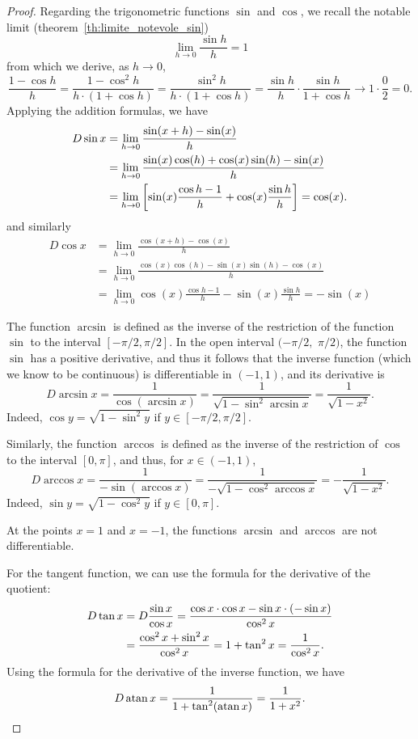 \begin{proof}
Regarding the trigonometric functions 
$\sin$ and $\cos$, we recall the notable limit
(theorem~\ref{th:limite_notevole_sin})
\[
  \lim_{h\to 0}\frac{\sin h}{h} = 1
\]
from which we derive, as $h\to 0$, 
\[
\frac{1-\cos h}{h}
= \frac{1-\cos^2 h}{h\cdot(1+\cos h)}
= \frac{\sin^2 h}{h\cdot (1+\cos h)}
= \frac{\sin h}{h} \cdot \frac{\sin h}{1+\cos h}
\to 1 \cdot \frac{0}{2} = 0.
\]
Applying the addition formulas, we have
\begin{align*}
  D \sin x
  &= \lim_{h\to 0}\frac{\sin(x+h)-\sin(x)}{h} \\
  &= \lim_{h\to 0}\frac{\sin(x)\cos(h) + \cos(x)\sin(h) - \sin(x)}{h} \\
    &= \lim_{h\to 0}{\left[ \sin(x) \frac{\cos h-1}{h} + \cos(x) \frac{\sin
  h}{h} \right]}
  = \cos(x).
\end{align*}
and similarly
\begin{align*}
  D \cos x
  &= \lim_{h\to 0}\frac{\cos(x+h)-\cos(x)}{h} \\
  &= \lim_{h\to 0}\frac{\cos(x)\cos(h) - \sin(x)\sin(h) - \cos(x)}{h} \\
    &= \lim_{h\to 0}\cos(x) \frac{\cos h-1}{h} - \sin(x) \frac{\sin h}{h} =
  -\sin(x)
\end{align*}

The function $\arcsin$ is defined as the inverse of the restriction of the
function $\sin$ to the interval $[-\pi/2, \pi/2]$.
In the open interval $(-\pi/2,$ $\pi/2)$, the function $\sin$ has a positive
derivative, and thus it follows that the inverse function (which we know to be
continuous) is differentiable in $(-1,1)$, and its derivative is
\[
D\arcsin x
= \frac{1}{\cos(\arcsin x)}
= \frac{1}{\sqrt{1-\sin^2 \arcsin x}}
= \frac{1}{\sqrt{1-x^2}}.
\]
Indeed, $\cos y = \sqrt{1-\sin^2 y}$ if $y\in [-\pi/2, \pi/2]$.

Similarly, the function $\arccos$ is defined as the inverse of the restriction
of $\cos$ to the interval $[0,\pi]$, and thus, for $x\in (-1,1)$,
\[
D \arccos x
 = \frac{1}{-\sin(\arccos x)}
 = \frac{1}{-\sqrt{1-\cos^2 \arccos x}}
 = -\frac{1}{\sqrt{1-x^2}}.
\]
Indeed, $\sin y = \sqrt{1-\cos^2 y}$ if $y\in[0,\pi]$.

At the points $x=1$ and $x=-1$, the functions $\arcsin$ and $\arccos$ are not
differentiable.

For the tangent function, we can use the formula for the derivative of the
quotient:
\begin{align*}
  D \operatorname{tan} x &= D \frac{\sin x }{\cos x}
   = \frac{\cos x \cdot \cos x - \sin x \cdot (-\sin x)}{\cos^2 x} \\
   &= \frac{\cos^2 x + \sin^2 x}{\cos^2 x}
   = 1 + \operatorname{tan}^2 x = \frac{1}{\cos^2 x}.
\end{align*}
Using the formula for the derivative of the inverse function, we have
\[
  D \operatorname{atan} x = \frac{1}{1+\operatorname{tan}^2(\operatorname{atan} x)}
  = \frac{1}{1+x^2}.
\]


\end{proof}
